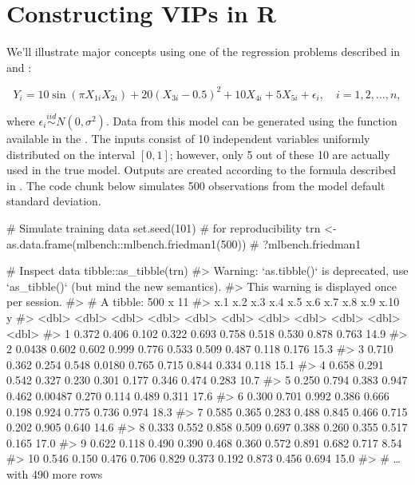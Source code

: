 \section{Constructing VIPs in R}

We'll illustrate major concepts using one of the regression problems described in \citet{multivariate-friedman-1991} and \citet{bagging-breiman-1996}: 

\begin{equation}
  Y_i = 10 \sin\left(\pi X_{1i} X_{2i}\right) + 20 \left(X_{3i} - 0.5\right) ^ 2 + 10 X_{4i} + 5 X_{5i} + \epsilon_i, \quad i = 1, 2, \dots, n,
\end{equation}

where $\epsilon_i \stackrel{iid}{\sim} N\left(0, \sigma^2\right)$. Data from this model can be generated using the  function available in the  \citep{mlbench-pkg}. The inputs consist of 10 independent variables uniformly distributed on the interval $\left[0,1\right]$; however, only 5 out of these 10 are actually used in the true model. Outputs are created according to the formula described in . The code chunk below simulates 500 observations from the model default standard deviation.

\begin{example}
# Simulate training data
set.seed(101)  # for reproducibility
trn <- as.data.frame(mlbench::mlbench.friedman1(500))  # ?mlbench.friedman1

# Inspect data
tibble::as_tibble(trn)
#> Warning: `as.tibble()` is deprecated, use `as_tibble()` (but mind the new semantics).
#> This warning is displayed once per session.
#> # A tibble: 500 x 11
#>       x.1   x.2   x.3   x.4    x.5     x.6   x.7   x.8   x.9  x.10     y
#>     <dbl> <dbl> <dbl> <dbl>  <dbl>   <dbl> <dbl> <dbl> <dbl> <dbl> <dbl>
#>  1 0.372  0.406 0.102 0.322 0.693  0.758   0.518 0.530 0.878 0.763 14.9 
#>  2 0.0438 0.602 0.602 0.999 0.776  0.533   0.509 0.487 0.118 0.176 15.3 
#>  3 0.710  0.362 0.254 0.548 0.0180 0.765   0.715 0.844 0.334 0.118 15.1 
#>  4 0.658  0.291 0.542 0.327 0.230  0.301   0.177 0.346 0.474 0.283 10.7 
#>  5 0.250  0.794 0.383 0.947 0.462  0.00487 0.270 0.114 0.489 0.311 17.6 
#>  6 0.300  0.701 0.992 0.386 0.666  0.198   0.924 0.775 0.736 0.974 18.3 
#>  7 0.585  0.365 0.283 0.488 0.845  0.466   0.715 0.202 0.905 0.640 14.6 
#>  8 0.333  0.552 0.858 0.509 0.697  0.388   0.260 0.355 0.517 0.165 17.0 
#>  9 0.622  0.118 0.490 0.390 0.468  0.360   0.572 0.891 0.682 0.717  8.54
#> 10 0.546  0.150 0.476 0.706 0.829  0.373   0.192 0.873 0.456 0.694 15.0 
#> # … with 490 more rows
\end{example}

